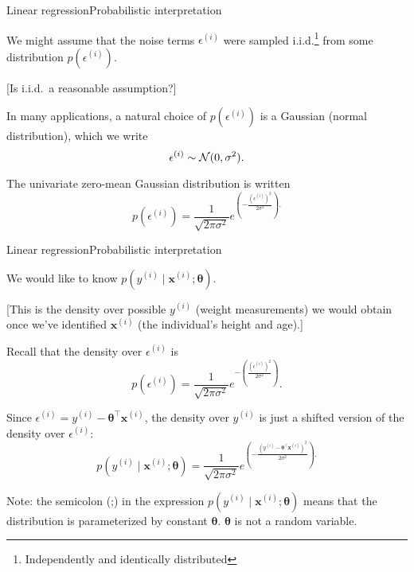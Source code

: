 \documentclass{beamer}
\renewcommand{\vec}[1]{\boldsymbol{#1}}
\begin{document}
\begin{frame}{Linear regression}{Probabilistic interpretation}

  We might assume that the noise terms $\epsilon^{(i)}$
  were sampled i.i.d.\footnote{Independently and identically distributed}
  from some distribution $p(\epsilon^{(i)})$.

  \medskip

  [Is i.i.d.\ a reasonable assumption?]

  \medskip

  In many applications, a natural choice of $p(\epsilon^{(i)})$ is a
  \alert{Gaussian} (normal distribution), which we write
  \[ \epsilon^{(i)} \sim {\cal N}(0, \sigma^2). \]

  \medskip

  The univariate zero-mean Gaussian distribution is written
  \[ p(\epsilon^{(i)}) = \frac{1}{\sqrt{2\pi\sigma^2}} e^{\left( -\frac{(\epsilon^{(i)})^2}{2\sigma^2} \right) .} \]
  
\end{frame}


\begin{frame}{Linear regression}{Probabilistic interpretation}

  We would like to know $p(y^{(i)} \mid \vec{x}^{(i)} ; \vec{\theta})$.

  \medskip

  [This is the density over possible $y^{(i)}$ (weight measurements)
    we would obtain once we've identified $\vec{x}^{(i)}$ (the
    individual's height and age).]

  \medskip

  Recall that the density over $\epsilon^{(i)}$ is
  \[ p(\epsilon^{(i)}) = \frac{1}{\sqrt{2\pi\sigma^2}}
     e^{-\left(\frac{(\epsilon^{(i)})^2}{2\sigma^2}\right)}. \]

  \medskip
  
  Since $\epsilon^{(i)} = y^{(i)} - \vec{\theta}^\top\vec{x}^{(i)}$,
  the density
  over $y^{(i)}$ is just a shifted version of the density over $\epsilon^{(i)}$:
  \[ p(y^{(i)} \mid \vec{x}^{(i)} ; \vec{\theta} ) = \frac{1}{\sqrt{2\pi\sigma^2}} e^{\left( -\frac{(y^{(i)}-\vec{\theta}^\top\vec{x}^{(i)})^2}{2\sigma^2} \right) .} \]

  \medskip

  Note: the semicolon (;) in the expression $p(y^{(i)} \mid
  \vec{x}^{(i)} ; \vec{\theta} )$ means that the distribution is
  \alert{parameterized} by constant $\vec{\theta}$. $\vec{\theta}$ is
  not a random variable.
   
\end{frame}
\end{document}
